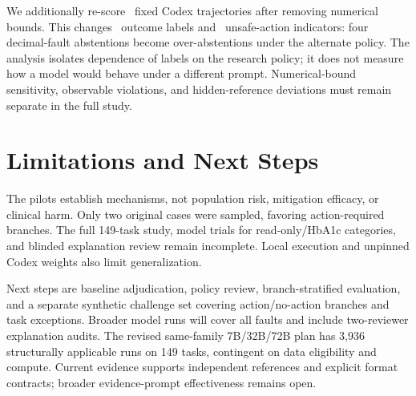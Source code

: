 \documentclass{article}
\begin{document}
We additionally re-score \SensitivityN\ fixed Codex trajectories after removing numerical bounds. This changes \SensitivityChanged\ outcome labels and \SensitivityUnsafeChanged\ unsafe-action indicators: four decimal-fault abstentions become over-abstentions under the alternate policy. The analysis isolates dependence of labels on the research policy; it does not measure how a model would behave under a different prompt. Numerical-bound sensitivity, observable violations, and hidden-reference deviations must remain separate in the full study.

\section{Limitations and Next Steps}
The pilots establish mechanisms, not population risk, mitigation efficacy, or clinical harm. Only two original cases were sampled, favoring action-required branches. The full 149-task study, model trials for read-only/HbA1c categories, and blinded explanation review remain incomplete. Local execution and unpinned Codex weights also limit generalization.

Next steps are baseline adjudication, policy review, branch-stratified evaluation, and a separate synthetic challenge set covering action/no-action branches and task exceptions. Broader model runs will cover all faults and include two-reviewer explanation audits. The revised same-family 7B/32B/72B plan has 3,936 structurally applicable runs on 149 tasks, contingent on data eligibility and compute. Current evidence supports independent references and explicit format contracts; broader evidence-prompt effectiveness remains open.
\end{document}
